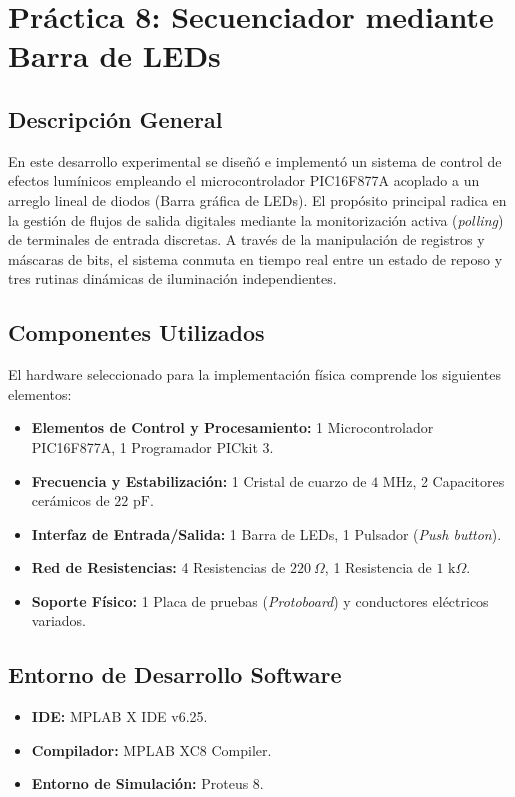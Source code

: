 \section{Práctica 8: Secuenciador mediante Barra de LEDs}

\subsection{Descripción General}
En este desarrollo experimental se diseñó e implementó un sistema de control de efectos lumínicos empleando el microcontrolador PIC16F877A acoplado a un arreglo lineal de diodos (Barra gráfica de LEDs). El propósito principal radica en la gestión de flujos de salida digitales mediante la monitorización activa (\textit{polling}) de terminales de entrada discretas. A través de la manipulación de registros y máscaras de bits, el sistema conmuta en tiempo real entre un estado de reposo y tres rutinas dinámicas de iluminación independientes.

\subsection{Componentes Utilizados}
El hardware seleccionado para la implementación física comprende los siguientes elementos:
\begin{itemize}
    \item \textbf{Elementos de Control y Procesamiento:} 1 Microcontrolador PIC16F877A, 1 Programador PICkit 3.
    \item \textbf{Frecuencia y Estabilización:} 1 Cristal de cuarzo de $4\text{ MHz}$, 2 Capacitores cerámicos de $22\text{ pF}$.
    \item \textbf{Interfaz de Entrada/Salida:} 1 Barra de LEDs, 1 Pulsador (\textit{Push button}).
    \item \textbf{Red de Resistencias:} 4 Resistencias de $220\ \Omega$, 1 Resistencia de $1\text{ k}\Omega$.
    \item \textbf{Soporte Físico:} 1 Placa de pruebas (\textit{Protoboard}) y conductores eléctricos variados.
\end{itemize}

\subsection{Entorno de Desarrollo Software}
\begin{itemize}
    \item \textbf{IDE:} MPLAB X IDE v6.25.
    \item \textbf{Compilador:} MPLAB XC8 Compiler.
    \item \textbf{Entorno de Simulación:} Proteus 8.
\end{itemize}

